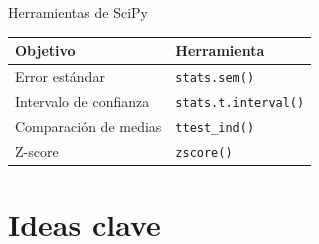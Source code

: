 \documentclass[aspectratio=169,11pt]{beamer}
\begin{document}
\begin{frame}{Herramientas de SciPy}

\small

\begin{table}
\centering

\begin{tabular}{ll}
\toprule

\textbf{Objetivo} &
\textbf{Herramienta} \\

\midrule

Error estándar &
\texttt{stats.sem()} \\

Intervalo de confianza &
\texttt{stats.t.interval()} \\

Comparación de medias &
\texttt{ttest\_ind()} \\

Z-score &
\texttt{zscore()} \\

\bottomrule

\end{tabular}

\end{table}

\end{frame}

\section{Ideas clave}
\end{document}
